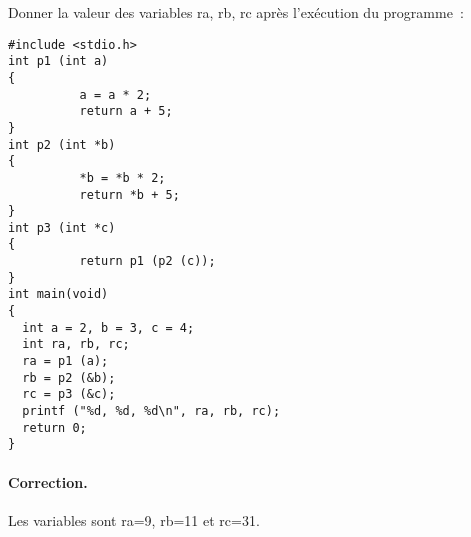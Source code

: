 Donner la valeur des variables ra, rb, rc apr\`es l'ex\'ecution du programme~:
\begin{verbatim}
#include <stdio.h>
int p1 (int a)
{
          a = a * 2;
          return a + 5;
}
int p2 (int *b)
{
          *b = *b * 2;
          return *b + 5;
}
int p3 (int *c)
{
          return p1 (p2 (c));
}
int main(void)
{
  int a = 2, b = 3, c = 4;
  int ra, rb, rc;
  ra = p1 (a);
  rb = p2 (&b);
  rc = p3 (&c);
  printf ("%d, %d, %d\n", ra, rb, rc);
  return 0;
}
\end{verbatim}
\ifcorrection
\paragraph{Correction.}
Les variables sont ra=9, rb=11 et rc=31.
\fi
